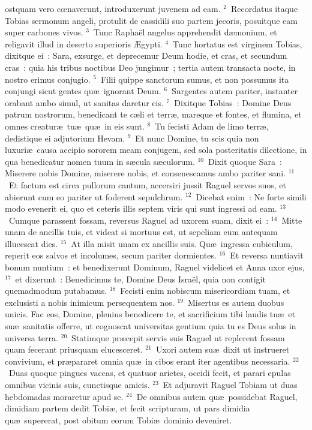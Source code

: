 \bchapter
{}ostquam vero cœnaverunt, introduxerunt juvenem ad eam.
${}^{2}$~Recordatus itaque Tobias sermonum angeli, protulit de cassidili suo partem jecoris, posuitque eam super carbones vivos.
${}^{3}$~Tunc Rapha\"el angelus apprehendit d\ae monium, et religavit illud in deserto superioris \AE gypti.
${}^{4}$~Tunc hortatus est virginem Tobias, dixitque ei~: Sara, exsurge, et deprecemur Deum hodie, et cras, et secundum cras~: quia his tribus noctibus Deo jungimur~; tertia autem transacta nocte, in nostro erimus conjugio.
${}^{5}$~Filii quippe sanctorum sumus, et non possumus ita conjungi sicut gentes qu\ae\ ignorant Deum.
${}^{6}$~Surgentes autem pariter, instanter orabant ambo simul, ut sanitas daretur eis.
${}^{7}$~Dixitque Tobias~: Domine Deus patrum nostrorum, benedicant te c\ae li et terr\ae , mareque et fontes, et flumina, et omnes creatur\ae\ tu\ae\ qu\ae\ in eis sunt.
${}^{8}$~Tu fecisti Adam de limo terr\ae , dedistique ei adjutorium Hevam.
${}^{9}$~Et nunc Domine, tu scis quia non luxuri\ae\ causa accipio sororem meam conjugem, sed sola posteritatis dilectione, in qua benedicatur nomen tuum in s\ae cula s\ae culorum.
${}^{10}$~Dixit quoque Sara~: Miserere nobis Domine, miserere nobis, et consenescamus ambo pariter sani.
${}^{11}$~Et factum est circa pullorum cantum, accersiri jussit Raguel servos suos, et abierunt cum eo pariter ut foderent sepulchrum.
${}^{12}$~Dicebat enim~: Ne forte simili modo evenerit ei, quo et ceteris illis septem viris qui sunt ingressi ad eam.
${}^{13}$~Cumque parassent fossam, reversus Raguel ad uxorem suam, dixit ei~:
${}^{14}$~Mitte unam de ancillis tuis, et videat si mortuus est, ut sepeliam eum antequam illucescat dies.
${}^{15}$~At illa misit unam ex ancillis suis. Qu\ae\ ingressa cubiculum, reperit eos salvos et incolumes, secum pariter dormientes.
${}^{16}$~Et reversa nuntiavit bonum nuntium~: et benedixerunt Dominum, Raguel videlicet et Anna uxor ejus,
${}^{17}$~et dixerunt~: Benedicimus te, Domine Deus Isra\"el, quia non contigit quemadmodum putabamus.
${}^{18}$~Fecisti enim nobiscum misericordiam tuam, et exclusisti a nobis inimicum persequentem nos.
${}^{19}$~Misertus es autem duobus unicis. Fac eos, Domine, plenius benedicere te, et sacrificium tibi laudis tu\ae\ et su\ae\ sanitatis offerre, ut cognoscat universitas gentium quia tu es Deus solus in universa terra.
${}^{20}$~Statimque pr\ae cepit servis suis Raguel ut replerent fossam quam fecerant priusquam elucesceret.
${}^{21}$~Uxori autem su\ae\ dixit ut instrueret convivium, et pr\ae pararet omnia qu\ae\ in cibos erant iter agentibus necessaria.
${}^{22}$~Duas quoque pingues vaccas, et quatuor arietes, occidi fecit, et parari epulas omnibus vicinis suis, cunctisque amicis.
${}^{23}$~Et adjuravit Raguel Tobiam ut duas hebdomadas moraretur apud se.
${}^{24}$~De omnibus autem qu\ae\ possidebat Raguel, dimidiam partem dedit Tobi\ae , et fecit scripturam, ut pars dimidia qu\ae\ supererat, post obitum eorum Tobi\ae\ dominio deveniret.

